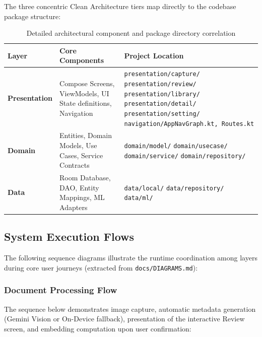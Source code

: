 The three concentric Clean Architecture tiers map directly to the codebase package structure:

\begin{table}[H]
\centering
\small
\begin{tabularx}{\textwidth}{l p{4.5cm} X}
\toprule
\textbf{Layer} & \textbf{Core Components} & \textbf{Project Location} \\
\midrule
\textbf{Presentation} & Compose Screens, ViewModels, UI State definitions, Navigation & 
\texttt{presentation/capture/} \newline
\texttt{presentation/review/} \newline
\texttt{presentation/library/} \newline
\texttt{presentation/detail/} \newline
\texttt{presentation/setting/} \newline
\texttt{navigation/AppNavGraph.kt, Routes.kt} \\
\midrule
\textbf{Domain} & Entities, Domain Models, Use Cases, Service Contracts & 
\texttt{domain/model/} \newline
\texttt{domain/usecase/} \newline
\texttt{domain/service/} \newline
\texttt{domain/repository/} \\
\midrule
\textbf{Data} & Room Database, DAO, Entity Mappings, ML Adapters & 
\texttt{data/local/} \newline
\texttt{data/repository/} \newline
\texttt{data/ml/} \\
\bottomrule
\end{tabularx}
\caption{Detailed architectural component and package directory correlation}
\label{tab:arch_mapping}
\end{table}

\subsection{System Execution Flows}
The following sequence diagrams illustrate the runtime coordination among layers during core user journeys (extracted from \texttt{docs/DIAGRAMS.md}):

\subsubsection{Document Processing Flow}
The sequence below demonstrates image capture, automatic metadata generation (Gemini Vision or On-Device fallback), presentation of the interactive Review screen, and embedding computation upon user confirmation:

